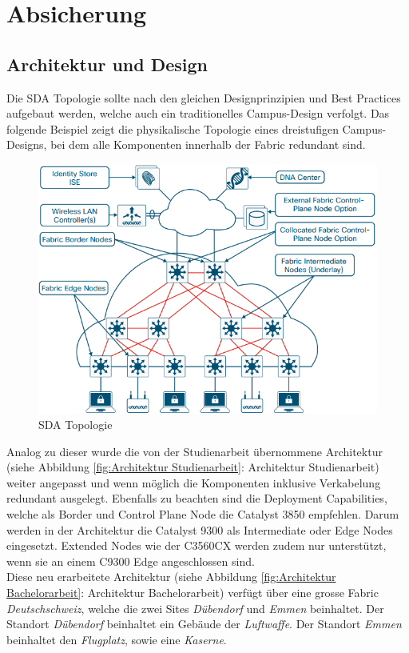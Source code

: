 \section{Absicherung}

\subsection{Architektur und Design}
Die SDA Topologie sollte nach den gleichen Designprinzipien und Best Practices aufgebaut werden, welche auch ein traditionelles Campus-Design verfolgt. Das folgende Beispiel zeigt die physikalische Topologie eines dreistufigen Campus-Designs, bei dem alle Komponenten innerhalb der Fabric redundant sind.

\begin{figure}[H]
	\centering
	\includegraphics[width=0.8\linewidth]{img/Absicherung/SDA-Architektur}
	\caption{SDA Topologie \cite{sda-designguide-sept2018} }
	\label{fig:SDA Topologie}
\end{figure}

Analog zu dieser wurde die von der Studienarbeit übernommene Architektur (siehe Abbildung \ref{fig:Architektur Studienarbeit}: Architektur Studienarbeit) weiter angepasst und wenn möglich die Komponenten inklusive Verkabelung redundant ausgelegt. Ebenfalls zu beachten sind die Deployment Capabilities, welche als Border und Control Plane Node die Catalyst 3850 empfehlen. Darum werden in der Architektur die Catalyst 9300 als Intermediate oder Edge Nodes eingesetzt. Extended Nodes wie der C3560CX werden zudem nur unterstützt, wenn sie an einem C9300 Edge angeschlossen sind. \\

Diese neu erarbeitete Architektur (siehe Abbildung \ref{fig:Architektur Bachelorarbeit}: Architektur Bachelorarbeit) verfügt über eine grosse Fabric \textit{Deutschschweiz}, welche die zwei Sites \textit{Dübendorf} und \textit{Emmen} beinhaltet. Der Standort \textit{Dübendorf} beinhaltet ein Gebäude der \textit{Luftwaffe}. Der Standort \textit{Emmen} beinhaltet den \textit{Flugplatz}, sowie eine \textit{Kaserne}.


